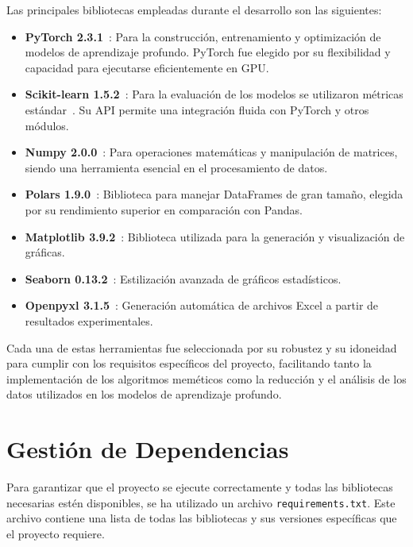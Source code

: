 Las principales bibliotecas empleadas durante el desarrollo son las siguientes:
\begin{itemize}
      \item \textbf{PyTorch 2.3.1}~\cite{ketkarIntroductionPyTorch2021, TorchcudaPyTorch24}: Para la construcción,
            entrenamiento y optimización de modelos de aprendizaje profundo.
            PyTorch fue elegido por su flexibilidad y capacidad para ejecutarse eficientemente en GPU\@.
      \item \textbf{Scikit-learn 1.5.2}~\cite{vanderplasPythonDataScience2016}: Para la evaluación de los modelos se utilizaron
            métricas estándar~\cite{kramerScikitLearn2016}.
            Su API permite una integración fluida con PyTorch y otros módulos.
      \item \textbf{Numpy 2.0.0}~\cite{NumPyV20Manual}: Para operaciones matemáticas y manipulación de matrices,
            siendo una herramienta esencial en el procesamiento de datos.
      \item \textbf{Polars 1.9.0}~\cite{PolarsPythonAPI}: Biblioteca para manejar DataFrames de gran tamaño,
            elegida por su rendimiento superior en comparación con Pandas.
      \item \textbf{Matplotlib 3.9.2}~\cite{Matplotlib393Documentation}: Biblioteca utilizada para la generación y
            visualización de gráficas.
      \item \textbf{Seaborn 0.13.2}~\cite{Seaborn0132Documentation}: Estilización avanzada de gráficos estadísticos.
      \item \textbf{Openpyxl 3.1.5}~\cite{Openpyxl313Documentation}: Generación automática de archivos Excel a partir de resultados experimentales.
\end{itemize}

Cada una de estas herramientas fue seleccionada por su robustez y su idoneidad para cumplir con los requisitos
específicos del proyecto, facilitando tanto la implementación de los algoritmos meméticos como la reducción y el
análisis de los datos utilizados en los modelos de aprendizaje profundo.

\section{Gestión de Dependencias}\label{sec:gestion-de-dependencias}
Para garantizar que el proyecto se ejecute correctamente y todas las bibliotecas necesarias estén disponibles, se ha
utilizado un archivo \texttt{requirements.txt}.
Este archivo contiene una lista de todas las bibliotecas y sus versiones específicas que el proyecto requiere.



